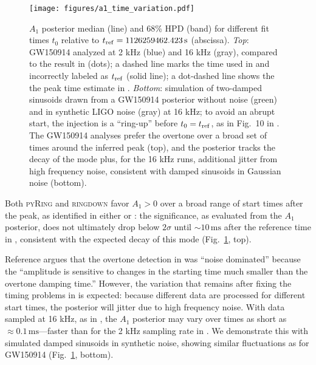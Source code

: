 \documentclass[aps,prd,twocolumn,superscriptaddress,preprintnumbers,floatfix,nofootinbib]{revtex4-2}
\begin{document}
\begin{figure}
  \caption{$A_1$ posterior median (line) and 68\% HPD (band) for different fit times $t_0$ relative to $t_{\rm ref} = 1126259462.423 \, \mathrm{s}$ (abscissa). \emph{Top}: GW150914 analyzed at 2 kHz (blue) and 16 kHz (gray), compared to the result in \cite{Finch:2022ynt} (dots); a dashed line marks the time used in \cite{Cotesta:2022pci} and incorrectly labeled as $t_{\rm ref}$ (solid line); a dot-dashed line shows the the peak time estimate in \cite{Cotesta:2022pci}.
  \emph{Bottom}: simulation of two-damped sinusoids drawn from a GW150914 posterior without noise (green) and in synthetic LIGO noise (gray) at 16 kHz; to avoid an abrupt start, the injection is a ``ring-up'' before $t_0 = t_{\rm ref}$, as in Fig.~10 in \cite{Isi:2021iql}.
  The GW150914 analyses prefer the overtone over a broad set of times around the inferred peak (top), and the posterior tracks the decay of the mode plus, for the 16 kHz runs, additional jitter from high frequency noise, consistent with damped sinusoids in Gaussian noise (bottom).}
  \texttt{[image: figures/a1\_time\_variation.pdf]}
  \label{fig:variation}
\end{figure}

Both \textsc{pyRing} and \textsc{ringdown} favor $A_1 > 0$ over a broad range of start times after the peak, as identified in either  \cite{Isi:2022mhy} or  \cite{Cotesta:2022pci}:
the significance, as evaluated from the $A_1$ posterior, does not ultimately drop below $2\sigma$ until {${\sim}10\,\mathrm{ms}$} after the reference time in \cite{Isi:2022mhy}, consistent with the expected decay of this mode (Fig.~\ref{fig:variation}, top).

Reference \cite{Cotesta:2022pci} argues that the overtone detection in \cite{Isi:2019aib} was ``noise dominated'' because the ``amplitude is sensitive to changes in the starting time much smaller than the overtone damping time.''
However, the variation that remains after fixing the timing problems in \cite{Cotesta:2022pci} is expected: because different data are processed for different start times, the posterior will jitter due to high frequency noise.
With data sampled at 16 kHz, as in \cite{Cotesta:2022pci}, the $A_1$ posterior may vary over times as short as $\approx 0.1\, \mathrm{ms}$---faster than for the 2 kHz sampling rate in \cite{Isi:2019aib,Isi:2022mhy}.
We demonstrate this with simulated damped sinusoids in synthetic noise, showing similar fluctuations as for GW150914 (Fig.~\ref{fig:variation}, bottom).
\end{document}
